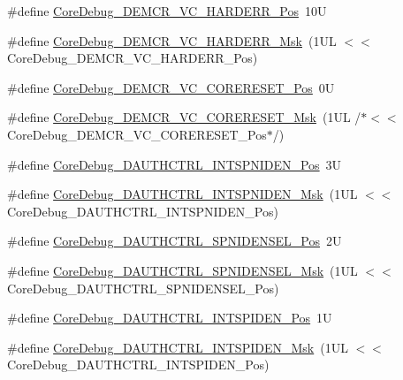 \begin{DoxyCompactItemize}
\item 
\#define \mbox{\hyperlink{group___c_m_s_i_s___core_debug_gaed9f42053031a9a30cd8054623304c0a}{Core\+Debug\+\_\+\+D\+E\+M\+C\+R\+\_\+\+V\+C\+\_\+\+H\+A\+R\+D\+E\+R\+R\+\_\+\+Pos}}~10U
\item 
\#define \mbox{\hyperlink{group___c_m_s_i_s___core_debug_ga803fc98c5bb85f10f0347b23794847d1}{Core\+Debug\+\_\+\+D\+E\+M\+C\+R\+\_\+\+V\+C\+\_\+\+H\+A\+R\+D\+E\+R\+R\+\_\+\+Msk}}~(1\+U\+L $<$$<$ Core\+Debug\+\_\+\+D\+E\+M\+C\+R\+\_\+\+V\+C\+\_\+\+H\+A\+R\+D\+E\+R\+R\+\_\+\+Pos)
\item 
\#define \mbox{\hyperlink{group___c_m_s_i_s___core_debug_ga9fcf09666f7063a7303117aa32a85d5a}{Core\+Debug\+\_\+\+D\+E\+M\+C\+R\+\_\+\+V\+C\+\_\+\+C\+O\+R\+E\+R\+E\+S\+E\+T\+\_\+\+Pos}}~0U
\item 
\#define \mbox{\hyperlink{group___c_m_s_i_s___core_debug_ga906476e53c1e1487c30f3a1181df9e30}{Core\+Debug\+\_\+\+D\+E\+M\+C\+R\+\_\+\+V\+C\+\_\+\+C\+O\+R\+E\+R\+E\+S\+E\+T\+\_\+\+Msk}}~(1\+U\+L /$\ast$$<$$<$ Core\+Debug\+\_\+\+D\+E\+M\+C\+R\+\_\+\+V\+C\+\_\+\+C\+O\+R\+E\+R\+E\+S\+E\+T\+\_\+\+Pos$\ast$/)
\item 
\#define \mbox{\hyperlink{group___c_m_s_i_s___core_debug_gaf733a36e6b4717a604f7d77c05dfceb4}{Core\+Debug\+\_\+\+D\+A\+U\+T\+H\+C\+T\+R\+L\+\_\+\+I\+N\+T\+S\+P\+N\+I\+D\+E\+N\+\_\+\+Pos}}~3U
\item 
\#define \mbox{\hyperlink{group___c_m_s_i_s___core_debug_gadad0bf68d32cba49c1ea7534122c2752}{Core\+Debug\+\_\+\+D\+A\+U\+T\+H\+C\+T\+R\+L\+\_\+\+I\+N\+T\+S\+P\+N\+I\+D\+E\+N\+\_\+\+Msk}}~(1\+U\+L $<$$<$ Core\+Debug\+\_\+\+D\+A\+U\+T\+H\+C\+T\+R\+L\+\_\+\+I\+N\+T\+S\+P\+N\+I\+D\+E\+N\+\_\+\+Pos)
\item 
\#define \mbox{\hyperlink{group___c_m_s_i_s___core_debug_ga866734a8e4bec2d6cf091e265c6c0f3d}{Core\+Debug\+\_\+\+D\+A\+U\+T\+H\+C\+T\+R\+L\+\_\+\+S\+P\+N\+I\+D\+E\+N\+S\+E\+L\+\_\+\+Pos}}~2U
\item 
\#define \mbox{\hyperlink{group___c_m_s_i_s___core_debug_gaabb5d6c750c9ec50254134ece2111dcd}{Core\+Debug\+\_\+\+D\+A\+U\+T\+H\+C\+T\+R\+L\+\_\+\+S\+P\+N\+I\+D\+E\+N\+S\+E\+L\+\_\+\+Msk}}~(1\+U\+L $<$$<$ Core\+Debug\+\_\+\+D\+A\+U\+T\+H\+C\+T\+R\+L\+\_\+\+S\+P\+N\+I\+D\+E\+N\+S\+E\+L\+\_\+\+Pos)
\item 
\#define \mbox{\hyperlink{group___c_m_s_i_s___core_debug_ga3caef9790e4e2ccbfea77d55315ad59f}{Core\+Debug\+\_\+\+D\+A\+U\+T\+H\+C\+T\+R\+L\+\_\+\+I\+N\+T\+S\+P\+I\+D\+E\+N\+\_\+\+Pos}}~1U
\item 
\#define \mbox{\hyperlink{group___c_m_s_i_s___core_debug_ga1570f149a0f89f70fc2644a5842cbcb4}{Core\+Debug\+\_\+\+D\+A\+U\+T\+H\+C\+T\+R\+L\+\_\+\+I\+N\+T\+S\+P\+I\+D\+E\+N\+\_\+\+Msk}}~(1\+U\+L $<$$<$ Core\+Debug\+\_\+\+D\+A\+U\+T\+H\+C\+T\+R\+L\+\_\+\+I\+N\+T\+S\+P\+I\+D\+E\+N\+\_\+\+Pos)

\end{DoxyCompactItemize}
